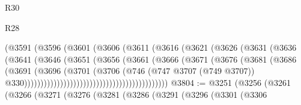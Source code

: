 \begin{lexlean}{R30}
\begin{lexlean}{R28}
\begin{coremodule}
{{{{{{{{{{{{{{{{{{{{{{{{{{{{{{{{{{{{{{{{{{{{{{{{{{{{{{{{{{{{{{{{{{{{{{{{{{{{{{{{{{{{{{{{{{{{{{{{{{{{{{{{{{{{{{{{{{{{{{{{{{{{{{{{{{{{{{{{{{{{{{{                                          (@3591
                                            (@3596
                                              (@3601
                                                (@3606
                                                  (@3611
                                                    (@3616
                                                      (@3621
                                                        (@3626
                                                          (@3631
                                                            (@3636
                                                              (@3641
                                                                (@3646
                                                                  (@3651
                                                                    (@3656
                                                                      (@3661
                                                                        (@3666
                                                                          (@3671
                                                                            (@3676
                                                                              (@3681
                                                                                (@3686
                                                                                  (@3691
                                                                                    (@3696
                                                                                      (@3701
                                                                                        (@3706
                                                                                          (@746
                                                                                            (@747
                                                                                              @3707
                                                                                              (@749
                                                                                                @3707))
                                                                                            @330))))))))))))))))))))))))))))))))))))))))))))
@3804 := @3251
    (@3256
      (@3261
        (@3266
          (@3271
            (@3276
              (@3281
                (@3286
                  (@3291
                    (@3296
                      (@3301
                        (@3306
}}}}}}}}}}}}}}}}}}}}}}}}}}}}}}}}}}}}}}}}}}}}}}}}}}}}}}}}}}}}}}}}}}}}}}}}}}}}}}}}}}}}}}}}}}}}}}}}}}}}}}}}}}}}}}}}}}}}}}}}}}}}}}}}}}}}}}}}}}}}}}}
\end{coremodule}
\end{lexlean}
\end{lexlean}
